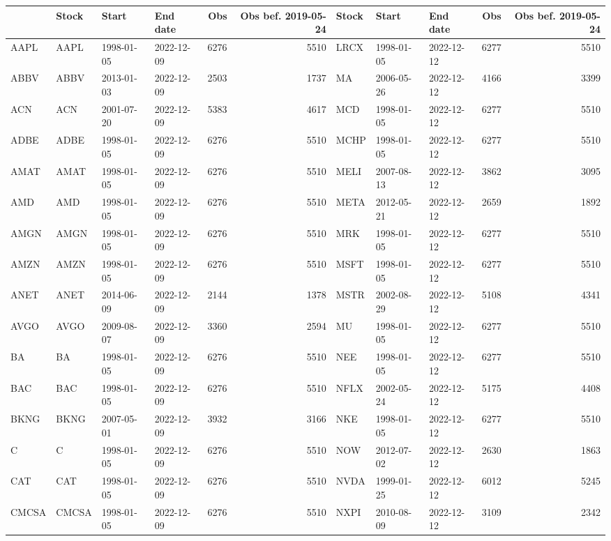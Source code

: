 \begin{table}[ht]
\centering
\begin{tabular}{llllrrlllrr}
  \hline
 & Stock & Start & End date & Obs & Obs bef. 2019-05-24 & Stock & Start & End date & Obs & Obs bef. 2019-05-24 \\ 
  \hline
AAPL & AAPL & 1998-01-05 & 2022-12-09 & 6276 & 5510 & LRCX & 1998-01-05 & 2022-12-12 & 6277 & 5510 \\ 
  ABBV & ABBV & 2013-01-03 & 2022-12-09 & 2503 & 1737 & MA & 2006-05-26 & 2022-12-12 & 4166 & 3399 \\ 
  ACN & ACN & 2001-07-20 & 2022-12-09 & 5383 & 4617 & MCD & 1998-01-05 & 2022-12-12 & 6277 & 5510 \\ 
  ADBE & ADBE & 1998-01-05 & 2022-12-09 & 6276 & 5510 & MCHP & 1998-01-05 & 2022-12-12 & 6277 & 5510 \\ 
  AMAT & AMAT & 1998-01-05 & 2022-12-09 & 6276 & 5510 & MELI & 2007-08-13 & 2022-12-12 & 3862 & 3095 \\ 
  AMD & AMD & 1998-01-05 & 2022-12-09 & 6276 & 5510 & META & 2012-05-21 & 2022-12-12 & 2659 & 1892 \\ 
  AMGN & AMGN & 1998-01-05 & 2022-12-09 & 6276 & 5510 & MRK & 1998-01-05 & 2022-12-12 & 6277 & 5510 \\ 
  AMZN & AMZN & 1998-01-05 & 2022-12-09 & 6276 & 5510 & MSFT & 1998-01-05 & 2022-12-12 & 6277 & 5510 \\ 
  ANET & ANET & 2014-06-09 & 2022-12-09 & 2144 & 1378 & MSTR & 2002-08-29 & 2022-12-12 & 5108 & 4341 \\ 
  AVGO & AVGO & 2009-08-07 & 2022-12-09 & 3360 & 2594 & MU & 1998-01-05 & 2022-12-12 & 6277 & 5510 \\ 
  BA & BA & 1998-01-05 & 2022-12-09 & 6276 & 5510 & NEE & 1998-01-05 & 2022-12-12 & 6277 & 5510 \\ 
  BAC & BAC & 1998-01-05 & 2022-12-09 & 6276 & 5510 & NFLX & 2002-05-24 & 2022-12-12 & 5175 & 4408 \\ 
  BKNG & BKNG & 2007-05-01 & 2022-12-09 & 3932 & 3166 & NKE & 1998-01-05 & 2022-12-12 & 6277 & 5510 \\ 
  C & C & 1998-01-05 & 2022-12-09 & 6276 & 5510 & NOW & 2012-07-02 & 2022-12-12 & 2630 & 1863 \\ 
  CAT & CAT & 1998-01-05 & 2022-12-09 & 6276 & 5510 & NVDA & 1999-01-25 & 2022-12-12 & 6012 & 5245 \\ 
  CMCSA & CMCSA & 1998-01-05 & 2022-12-09 & 6276 & 5510 & NXPI & 2010-08-09 & 2022-12-12 & 3109 & 2342 \\ 

\end{tabular}
\end{table}
